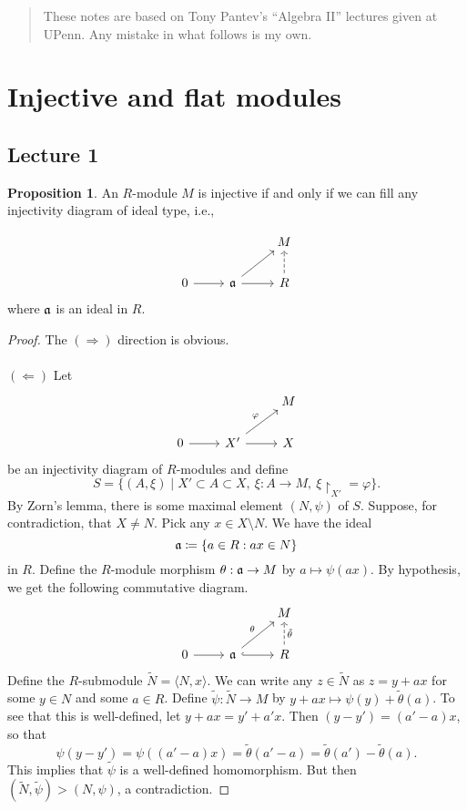 \documentclass[10pt,letterpaper,cm]{nupset}
\theoremstyle{definition}
\newtheorem{prop}{Proposition}
\newcommand{\1}{\mathbf{1}}
\newcommand{\0}{\vec 0}
\begin{document}
\begin{abstract}
These notes are based on Tony Pantev's ``Algebra II'' lectures given at UPenn. Any mistake in what follows is my own.
\end{abstract}

\tableofcontents
\newpage

\section{Injective and flat modules}

\subsection{Lecture 1}

\begin{prop} An $R$-module $M$ is injective if and only if we can fill any injectivity diagram of ideal type, i.e.,  

\[
\begin{tikzcd}
 &  & M \\
0 \arrow[r] & \frak{a} \arrow[r] \arrow[ru] & R \arrow[u, dashed]
\end{tikzcd}
\] 
where $\frak{a}$ is an ideal in $R$.
\end{prop}
\begin{proof}
The $(\Longrightarrow)$ direction is obvious.
\\ \\
$(\Longleftarrow)$ Let 
\[
\begin{tikzcd}
 &  & M \\
0 \arrow[r] & X' \arrow[ru, "\varphi"] \arrow[r] & X
\end{tikzcd} \] 
be an injectivity diagram of $R$-modules and define $$S = \{(A, \xi) \mid X' \subset A \subset X, \ \xi : A \to M, \ \xi \restriction_{X'} = \varphi\} . $$ By Zorn's lemma, there is some maximal element $(N, \psi)$ of $S$. Suppose, for contradiction, that $X \ne N$. Pick any $x\in X \setminus N$. We have the ideal $$\frak{a} \coloneqq  \{a \in R : ax \in N\}$$ in $R$. Define the $R$-module morphism $\theta : \frak{a} \to M$ by $a \mapsto \psi(ax)$. By hypothesis, we get the following commutative diagram.
\[
\begin{tikzcd}
 &  & M \\
0 \arrow[r] & \frak{a} \arrow[ru, "\theta"] \arrow[r, hook] & R \arrow[u, "\tilde{\theta}"', dashed]
\end{tikzcd}
\] Define the $R$-submodule $\widetilde{N} = \langle N, x\rangle$. We can write any $z\in \widetilde{N}$ as $z = y + ax$ for some $y\in N$ and some $a\in R$. Define $\tilde{\psi} : \widetilde{N} \to M$ by $y+ax \mapsto \psi(y) + \tilde{\theta}(a)$. To see that this is well-defined, let $y+ax = y'+a'x$. Then $(y-y') = (a'-a)x$, so that $$\psi(y-y') = \psi((a'-a)x) = \tilde{\theta}(a'-a) = \tilde{\theta}(a') - \tilde{\theta}(a) . $$
This implies that $\tilde{\psi}$ is a well-defined homomorphism. But then $(\widetilde{N}, \tilde{\psi})> (N, \psi)$, a contradiction.  
\end{proof}
\end{document}
